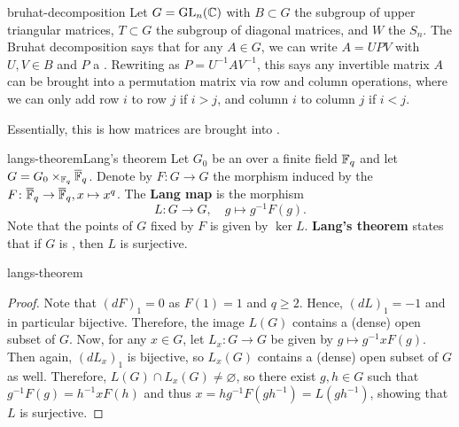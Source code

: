\begin{example}{bruhat-decomposition}
    Let $G = \textup{GL}_n(\mathbb{C})$ with $B \subset G$ the subgroup of upper triangular matrices, $T \subset G$ the subgroup of diagonal matrices, and $W$ the  $S_n$. The Bruhat decomposition says that for any $A \in G$, we can write $A = U P V$ with $U, V \in B$ and $P$ a . Rewriting as $P = U^{-1} A V^{-1}$, this says any invertible matrix $A$ can be brought into a permutation matrix via row and column operations, where we can only add row $i$ to row $j$ if $i > j$, and column $i$ to column $j$ if $i < j$.
    
    Essentially, this is how matrices are brought into .
\end{example}

\begin{topic}{langs-theorem}{Lang's theorem}
    Let $G_0$ be an  over a finite field $\mathbb{F}_q$ and let $G = G_0 \times_{\mathbb{F}_q} \overline{\mathbb{F}}_q$. Denote by $F \colon G \to G$ the morphism induced by the  $F \colon \overline{\mathbb{F}}_q \to \overline{\mathbb{F}}_q, x \mapsto x^q$. The \textbf{Lang map} is the morphism
    \[ L \colon G \to G, \quad g \mapsto g^{-1} F(g) . \]
    Note that the points of $G$ fixed by $F$ is given by $\ker L$. \textbf{Lang's theorem} states that if $G$ is , then $L$ is surjective.
\end{topic}

\begin{example}{langs-theorem}
    \begin{proof}
        Note that $(dF)_1 = 0$ as $F(1) = 1$ and $q \ge 2$. Hence, $(dL)_1 = -1$ and in particular bijective. Therefore, the image $L(G)$ contains a (dense) open subset of $G$. Now, for any $x \in G$, let $L_x \colon G \to G$ be given by $g \mapsto g^{-1} x F(g)$. Then again, $(dL_x)_1$ is bijective, so $L_x(G)$ contains a (dense) open subset of $G$ as well. Therefore, $L(G) \cap L_x(G) \ne \varnothing$, so there exist $g, h \in G$ such that $g^{-1} F(g) = h^{-1} x F(h)$ and thus $x = hg^{-1} F(gh^{-1}) = L(gh^{-1})$, showing that $L$ is surjective.
    \end{proof}
\end{example}


